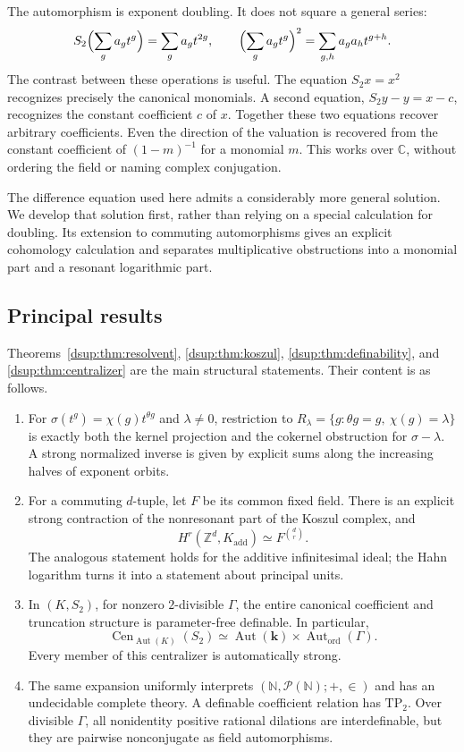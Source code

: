 \documentclass[11pt,oneside]{article}
\numberwithin{equation}{section}
\theoremstyle{definition}
\theoremstyle{remark}
\newcommand{\C}{\mathbb C}
\newcommand{\Z}{\mathbb Z}
\newcommand{\N}{\mathbb N}
\newcommand{\kk}{\mathbf k}
\newcommand{\Aut}{\operatorname{Aut}}
\DeclareMathOperator{\Cen}{Cen}
\begin{document}
The automorphism is exponent doubling. It does not square a general series:
\[
 S_2\Bigl(\sum_g a_gt^g\Bigr)=\sum_g a_gt^{2g},
 \qquad
 \Bigl(\sum_g a_gt^g\Bigr)^2=\sum_{g,h}a_ga_ht^{g+h}.
\]
The contrast between these operations is useful. The equation $S_2x=x^2$
recognizes precisely the canonical monomials. A second equation,
$S_2y-y=x-c$, recognizes the constant coefficient $c$ of $x$. Together these
two equations recover arbitrary coefficients. Even the direction of the
valuation is recovered from the constant coefficient of $(1-m)^{-1}$ for a
monomial $m$. This works over $\C$, without ordering the field or naming
complex conjugation.

The difference equation used here admits a considerably more general
solution. We develop that solution first, rather than relying on a special
calculation for doubling. Its extension to commuting automorphisms gives
an explicit cohomology calculation and separates multiplicative
obstructions into a monomial part and a resonant logarithmic part.

\subsection{Principal results}

Theorems~\ref{dsup:thm:resolvent}, \ref{dsup:thm:koszul}, \ref{dsup:thm:definability}, and
\ref{dsup:thm:centralizer} are the main structural statements. Their content is
as follows.

\begin{enumerate}[leftmargin=*,itemsep=4pt]
\item For $\sigma(t^g)=\chi(g)t^{\theta g}$ and $\lambda\ne0$, restriction to
$R_\lambda=\{g:\theta g=g,\ \chi(g)=\lambda\}$ is exactly both the kernel
projection and the cokernel obstruction for $\sigma-\lambda$. A strong
normalized inverse is given by explicit sums along the increasing
halves of exponent orbits.
\item For a commuting $d$-tuple, let $F$ be its common fixed field. There is
an explicit strong contraction of the nonresonant part of the Koszul
complex, and
\[
 H^r(\Z^d,K_{\mathrm{add}})\simeq F^{\binom dr}.
\]
The analogous statement holds for the additive infinitesimal ideal; the
Hahn logarithm turns it into a statement about principal units.
\item In $(K,S_2)$, for nonzero $2$-divisible $\Gamma$, the entire canonical
coefficient and truncation structure is parameter-free definable. In
particular,
\[
 \Cen_{\Aut(K)}(S_2)
 \simeq \Aut(\kk)\times\Aut_{\mathrm{ord}}(\Gamma).
\]
Every member of this centralizer is automatically strong.
\item The same expansion uniformly interprets
$(\N,\mathcal P(\N);+,\in)$ and has an undecidable complete theory. A
definable coefficient relation has $\mathrm{TP}_2$. Over divisible
$\Gamma$, all nonidentity positive rational dilations are interdefinable,
but they are pairwise nonconjugate as field automorphisms.
\end{enumerate}
\end{document}
